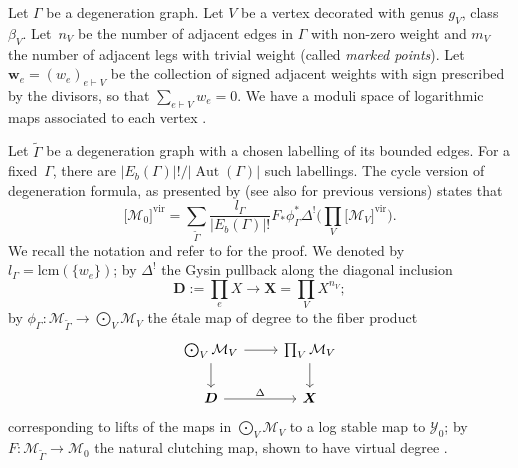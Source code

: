 \documentclass[pdftex]{sigma}
\newcommand{\vir}[1]{\big[#1\big]^\mathrm{vir}}
\newcommand{\bfX}{ {\boldsymbol X} }
\newcommand{\bfD}{ {\boldsymbol D} }
\newcommand{\bfw}{ {\boldsymbol w} }
\newcommand{\M}{\mathcal{M}}
\newcommand{\Y}{\mathcal{Y}}
\numberwithin{equation}{section}
\theoremstyle{definition}
\begin{document}
Let $\Gamma$ be a degeneration graph.
Let $V$ be a vertex decorated with genus $g_V$, class $\beta_V$. Let~$n_V$ be the number of adjacent edges in $\Gamma$ with non-zero weight and $m_V$ the number of adjacent legs with trivial weight (called \textit{marked points}). Let $\bfw_e=(w_e)_{e\vdash V}$ be the collection of signed adjacent weights with sign prescribed by the divisors, so that $\sum_{e\vdash V}w_e=0$. We have a moduli space of logarithmic maps associated to each vertex
\smash{$\M_V=\M_{g_V,m_V}(Y_{\phi(V)}|D_{\phi(V)},\beta_V,\bfw_e)$}.

Let $\widetilde{\Gamma}$ be a degeneration graph with a chosen labelling of its bounded edges. For a fixed~$\Gamma$, there are $|E_b(\Gamma)|!\slash|\operatorname{Aut}(\Gamma)|$ such labellings. The cycle version of degeneration formula, as presented by \cite{kim2010logarithmic} (see also \cite{chen2013degeneration,li2002degeneration} for previous versions) states that
\begin{equation}\label{eq:nonrefineddeg}
 \vir{\M_0} = \sum_{\widetilde{\Gamma}} \dfrac{l_{\Gamma}}{|E_b(\Gamma)|!} F_*\phi_{\Gamma}^*\Delta^!\biggl(\prod_V\vir{\M_V}\biggr).
\end{equation}
We recall the notation and refer to \cite{kim2018degeneration} for the proof. We denoted by $l_{\Gamma}=\mathrm{lcm}(\{ w_e\})$; by $\Delta^!$ the Gysin pullback along the diagonal inclusion
\[\bfD:=\prod_e X\to\bfX=\prod_V X^{n_V};\]
by $\phi_{\Gamma}\colon\M_{\widetilde{\Gamma}}\to \bigodot_V \M_V$ the \'etale map of degree  to the fiber product
\[
\begin{tikzcd}
\bigodot_V \M_V\ar[r]\ar[d] &\prod_V \M_V\ar[d]\\
\bfD\ar[r,"\Delta"] & \boldsymbol{X}
\end{tikzcd}
\]
corresponding to lifts of the maps in $\bigodot_V \M_V$ to a log stable map to $\Y_0$; by $F\colon \M_{\widetilde{\Gamma}}\to\M_0$ the natural clutching map, shown \cite[Lemma~9.1]{kim2010logarithmic} to have virtual degree .
\end{document}
